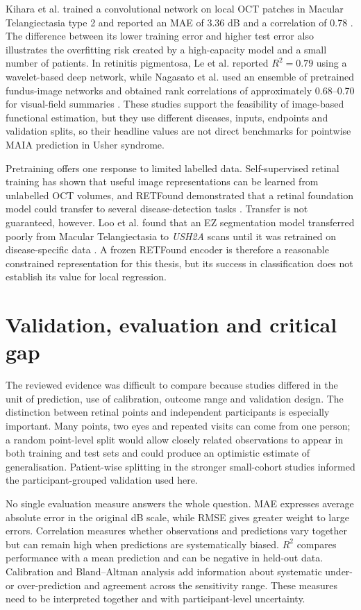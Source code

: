 Kihara et al. trained a convolutional network on local OCT patches in Macular Telangiectasia type 2 and reported an MAE of 3.36 dB and a correlation of 0.78 \cite{Kihara2019}. The difference between its lower training error and higher test error also illustrates the overfitting risk created by a high-capacity model and a small number of patients. In retinitis pigmentosa, Le et al. reported $R^2=0.79$ using a wavelet-based deep network, while Nagasato et al. used an ensemble of pretrained fundus-image networks and obtained rank correlations of approximately 0.68--0.70 for visual-field summaries \cite{Le2024,Ding2023}. These studies support the feasibility of image-based functional estimation, but they use different diseases, inputs, endpoints and validation splits, so their headline values are not direct benchmarks for pointwise MAIA prediction in Usher syndrome.

Pretraining offers one response to limited labelled data. Self-supervised retinal training has shown that useful image representations can be learned from unlabelled OCT volumes, and RETFound demonstrated that a retinal foundation model could transfer to several disease-detection tasks \cite{Gholami2024,Zhou2023RETFound}. Transfer is not guaranteed, however. Loo et al. found that an EZ segmentation model transferred poorly from Macular Telangiectasia to \textit{USH2A} scans until it was retrained on disease-specific data \cite{Loo2022}. A frozen RETFound encoder is therefore a reasonable constrained representation for this thesis, but its success in classification does not establish its value for local regression.

\section{Validation, evaluation and critical gap}

The reviewed evidence was difficult to compare because studies differed in the unit of prediction, use of calibration, outcome range and validation design. The distinction between retinal points and independent participants is especially important. Many points, two eyes and repeated visits can come from one person; a random point-level split would allow closely related observations to appear in both training and test sets and could produce an optimistic estimate of generalisation. Patient-wise splitting in the stronger small-cohort studies informed the participant-grouped validation used here.

No single evaluation measure answers the whole question. MAE expresses average absolute error in the original dB scale, while RMSE gives greater weight to large errors. Correlation measures whether observations and predictions vary together but can remain high when predictions are systematically biased. $R^2$ compares performance with a mean prediction and can be negative in held-out data. Calibration and Bland--Altman analysis add information about systematic under- or over-prediction and agreement across the sensitivity range. These measures need to be interpreted together and with participant-level uncertainty.


